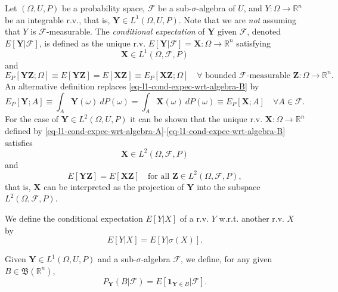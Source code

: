 Let $(\Omega,U,P)$ be a probability space,
$\mathcal{F}$ be a sub-$\sigma$-algebra of $U$,
and $Y:\Omega\rightarrow\mathbb{R}^n$ be an integrable r.v., that is, $\mathbf{Y}\in L^1(\Omega,U,P)$.
Note that we are {\it not} assuming that $Y$ is $\mathcal{F}$-measurable.
The {\it conditional expectation} of $\mathbf{Y}$ given $\mathcal{F}$,
denoted $E[\mathbf{Y}|\mathcal{F}]$,
is defined \cite{JaPr04} as the unique r.v. $E[\mathbf{Y}|\mathcal{F}]=\mathbf{X}:\Omega\rightarrow\mathbb{R}^n$ satisfying
\begin{equation}\label{eq-l1-cond-expec-wrt-algebra-A}
\mathbf{X}\in L^1(\Omega,\mathcal{F},P)
\end{equation}
and
\begin{equation}\label{eq-l1-cond-expec-wrt-algebra-B}
E_P[\mathbf{Y}\mathbf{Z};\Omega]\equiv E[\mathbf{Y}\mathbf{Z}] = E[\mathbf{X}\mathbf{Z}] \equiv E_P[\mathbf{X}\mathbf{Z};\Omega]
\quad
\forall\mbox{ bounded }\mathcal{F}\mbox{-measurable }\mathbf{Z}:\Omega\rightarrow\mathbb{R}^n.
\end{equation}
An alternative definition \cite{Du05} replaces \eqref{eq-l1-cond-expec-wrt-algebra-B} by
\begin{equation*}
E_P[\mathbf{Y};A]\equiv \int_A \mathbf{Y}(\omega)~dP(\omega) = \int_A \mathbf{X}(\omega)~dP(\omega)\equiv E_P[\mathbf{X};A] \quad\forall A\in\mathcal{F}.
\end{equation*}
For the case of $\mathbf{Y}\in L^2(\Omega,U,P)$ it can be shown \cite{JaPr04} that the
unique r.v. $\mathbf{X}:\Omega\rightarrow\mathbb{R}^n$ defined by \eqref{eq-l1-cond-expec-wrt-algebra-A}-\eqref{eq-l1-cond-expec-wrt-algebra-B} satisfies
\begin{equation}\label{eq-l2-cond-expec-wrt-algebra-A}
\mathbf{X}\in L^2(\Omega,\mathcal{F},P)
\end{equation}
and
\begin{equation}\label{eq-l2-cond-expec-wrt-algebra-B}
E[\mathbf{Y}\mathbf{Z}] = E[\mathbf{X}\mathbf{Z}]
\quad
\mbox{for all }\mathbf{Z}\in L^2(\Omega,\mathcal{F},P),
\end{equation}
that is, $\mathbf{X}$ can be interpreted as the projection of $\mathbf{Y}$ into the subspace $L^2(\Omega,\mathcal{F},P)$.

We define the conditional expectation $E[Y|X]$ of a r.v. $Y$ w.r.t. another r.v. $X$ by
\begin{equation*}
E[Y|X] = E[Y|\sigma(X)].
\end{equation*}

Given $\mathbf{Y}\in L^1(\Omega,U,P)$ and
a sub-$\sigma$-algebra $\mathcal{F}$,
we define,
for any given $B\in\mathfrak{B}(\mathbb{R}^n)$,
\begin{equation}\label{eq-cond-prob-wrt-algebra}
P_{\mathbf{Y}}(B|\mathcal{F}) = E[\mathbf{1}_{\mathbf{Y}\in B}|\mathcal{F}].
\end{equation}

